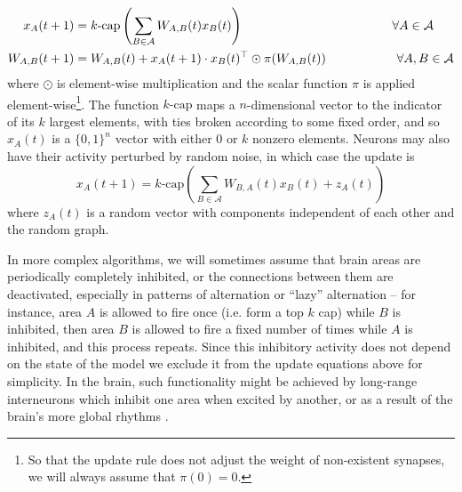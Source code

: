 \documentclass{article}
\theoremstyle{remark}
\newcommand{\1}{\mathbbm{1}}
\begin{document}
\begin{align*}
   x_A(t+1) &= k\text{-cap}\left(\sum_{B \in \mathcal A} W_{A, B}(t) x_B(t)\right) \hspace{4.2cm} \forall A \in \mathcal A\\
    W_{A, B}(t+1) &= W_{A, B}(t) + x_{A}(t+1) \cdot x_B(t)^\top \odot \pi(W_{A, B}(t)) \hspace{2cm} \forall A, B \in \mathcal A
\end{align*}
where $\odot$ is element-wise multiplication and the scalar function $\pi$ is applied element-wise\footnote{So that the update rule does not adjust the weight of non-existent synapses, we will always assume that $\pi(0) = 0$.}. The function $k\text{-cap}$ maps a $n$-dimensional vector to the indicator of its $k$ largest elements, with ties broken according to some fixed order, and so $x_A(t)$ is a $\{0, 1\}^n$ vector with either $0$ or $k$ nonzero elements. Neurons may also have their activity perturbed by random noise, in which case the update is
\[x_A(t+1) = k\text{-cap}\left(\sum_{B \in \mathcal A} W_{B, A}(t) x_B(t) + z_A(t)\right)\]
where $z_A(t)$ is a random vector with components independent of each other and the random graph.

In more complex algorithms, we will sometimes assume that brain areas are periodically completely inhibited, or the connections between them are deactivated, especially in patterns of alternation or ``lazy'' alternation -- for instance, area $A$ is allowed to fire once (i.e. form a top $k$ cap) while $B$ is inhibited, then area $B$ is allowed to fire a fixed number of times while $A$ is inhibited, and this process repeats. Since this inhibitory activity does not depend on the state of the model we exclude it from the update equations above for simplicity. In the brain, such functionality might be achieved by long-range interneurons which inhibit one area when excited by another, or as a result of the brain's more global rhythms \cite{buzsaki2010neural}.
\end{document}
